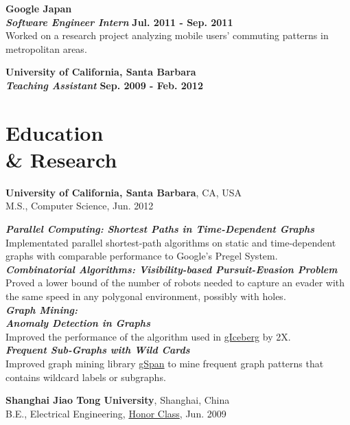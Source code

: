 \documentclass[margin,line]{res}
\begin{document}
\begin{resume}
{\bf{Google Japan}}\\
{\bf{\em Software Engineer Intern}} \hfill {\bf Jul. 2011 - Sep. 2011}\\
Worked on a research project analyzing mobile users' commuting patterns in metropolitan areas.

{\bf{University of California, Santa Barbara}}\\
{\bf{\em Teaching Assistant}} \hfill {\bf Sep. 2009 - Feb. 2012}

\section{\sc Education\\\& Research}
{\bf University of California, Santa Barbara}, CA, USA\\
M.S., Computer Science, Jun. 2012

\vspace*{-.1in}
{\bf{\em Parallel Computing: Shortest Paths in Time-Dependent Graphs}}\\
Implementated parallel shortest-path algorithms on static and time-dependent graphs with comparable performance to Google's Pregel System.\\

\vspace*{-.2in}
{\bf{\em Combinatorial Algorithms: Visibility-based Pursuit-Evasion Problem}}\\
Proved a lower bound of the number of robots needed to capture an evader with the same speed in any polygonal environment, possibly with holes.\\

\vspace*{-.2in}
{\bf{\em Graph Mining:\\\hspace*{.2in}Anomaly Detection in Graphs}}\\
Improved the performance of the algorithm used in \href{https://drive.google.com/open?id=1TMkCJGdvBT6-96O487QWsjsFdTMqDxQT}{gIceberg} by 2X.\\
{\bf{\em \hspace*{.2in}Frequent Sub-Graphs with Wild Cards}}\\
Improved graph mining library \href{https://www.cs.ucsb.edu/~xyan/software/gSpan.htm}{gSpan} to mine frequent graph patterns that contains wildcard labels or subgraphs.

{\bf Shanghai Jiao Tong University}, Shanghai, China\\
\vspace*{-.1in}
B.E., Electrical Engineering, \href{https://drive.google.com/open?id=16OkB9044sx22P3BQwLKHNrZMnmeHmUoZ}{Honor Class}, Jun. 2009


\end{resume}
\end{document}
